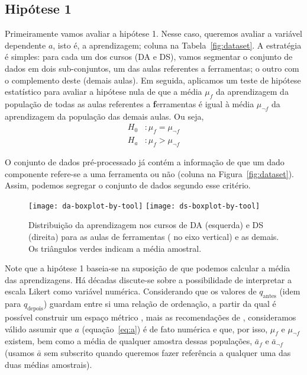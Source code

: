 \subsection{Hipótese 1}
\label{sec:resultados-hipotese-1}

Primeiramente vamos avaliar a hipótese 1.
Nesse caso, queremos avaliar a variável dependente $a$, isto é, a aprendizagem; coluna  na Tabela~\ref{fig:dataset}.
A estratégia é simples: para cada um dos cursos (DA e DS), vamos segmentar o conjunto de dados em dois sub-conjuntos, um das aulas referentes a ferramentas; o outro com o complemento deste (demais aulas).
Em seguida, aplicamos um teste de hipótese estatístico para avaliar a hipótese nula de que a média $\mu_f$ da aprendizagem da população de todas as aulas referentes a \textbf{f}erramentas é igual à média $\mu_{\neg f}$ da aprendizagem da população das demais aulas.
Ou seja,
\begin{align*}
	H_0&: \mu_f = \mu_{\neg f} \\
	H_a&: \mu_f > \mu_{\neg f}
\end{align*}

O conjunto de dados pré-processado já contém a informação de que um dado componente refere-se a uma ferramenta ou não (coluna  na Figura~\ref{fig:dataset}).
Assim, podemos segregar o conjunto de dados segundo esse critério.

\begin{figure}[b]
	\centering
	\texttt{[image: da-boxplot-by-tool]}\hfill
	\texttt{[image: ds-boxplot-by-tool]}
	\caption{Distribuição da aprendizagem nos cursos de DA (esquerda) e DS (direita) para as aulas de ferramentas ( no eixo vertical) e as demais. Os triângulos verdes indicam a média amostral.}
	\label{fig:dist-hipotese-1}
\end{figure}

Note que a hipótese 1 baseia-se na suposição de que podemos calcular a média das aprendizagens.
Há décadas discute-se sobre a possibilidade de interpretar a escala Likert como variável numérica.
Considerando que os valores de $q_\text{antes}$ (idem para $q_\text{depois}$) guardam entre si uma relação de ordenação, a partir da qual é possível construir um espaço métrico \cite[cap.~27]{Barata2020}, mais as recomendações de \cite{Harpe2015}, consideramos válido assumir que $a$ (equação~\ref{eq:a}) é de fato numérica e que, por isso, $\mu_f$ e $\mu_{\neg f}$ existem, bem como a média de qualquer amostra dessas populações, $\bar a_f$ e $\bar a_{\neg f}$ (usamos $\bar a$ sem subscrito quando queremos fazer referência a qualquer uma das duas médias amostrais).


